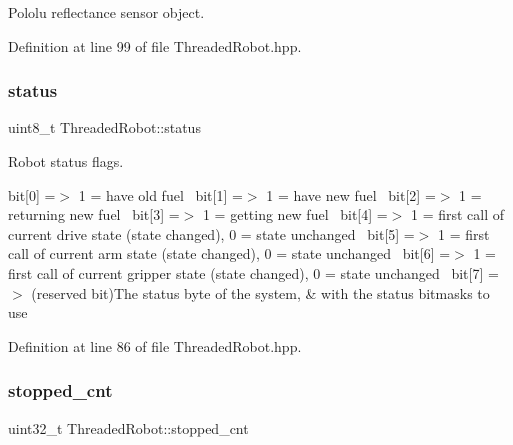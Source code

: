 Pololu reflectance sensor object. 



Definition at line 99 of file Threaded\+Robot.\+hpp.

\mbox{\label{class_threaded_robot_a10f3a9d1b27ca8e7a1ada75323c75879}} 
\subsubsection{\texorpdfstring{status}{status}}
{\footnotesize\ttfamily uint8\+\_\+t Threaded\+Robot\+::status\hspace{0.3cm}{\ttfamily [private]}}



Robot status flags. 

bit\mbox{[}0\mbox{]} =$>$ 1 = have old fuel~\newline
 bit\mbox{[}1\mbox{]} =$>$ 1 = have new fuel~\newline
 bit\mbox{[}2\mbox{]} =$>$ 1 = returning new fuel~\newline
 bit\mbox{[}3\mbox{]} =$>$ 1 = getting new fuel~\newline
 bit\mbox{[}4\mbox{]} =$>$ 1 = first call of current drive state (state changed), 0 = state unchanged~\newline
 bit\mbox{[}5\mbox{]} =$>$ 1 = first call of current arm state (state changed), 0 = state unchanged~\newline
 bit\mbox{[}6\mbox{]} =$>$ 1 = first call of current gripper state (state changed), 0 = state unchanged~\newline
 bit\mbox{[}7\mbox{]} =$>$ (reserved bit)The status byte of the system, \& with the status bitmasks to use 

Definition at line 86 of file Threaded\+Robot.\+hpp.

\mbox{\label{class_threaded_robot_a638cd7916d1c1c8a83d15c47a8fe6ef0}} 
\subsubsection{\texorpdfstring{stopped\+\_\+cnt}{stopped\_cnt}}
{\footnotesize\ttfamily uint32\+\_\+t Threaded\+Robot\+::stopped\+\_\+cnt\hspace{0.3cm}{\ttfamily [private]}}



